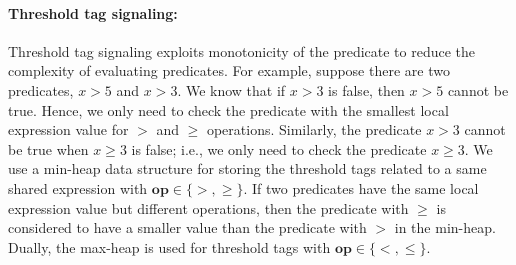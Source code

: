\documentclass{sigplanconf}
\newtheorem{definition}{Definition}
\begin{document}
\paragraph{Threshold tag signaling:}
Threshold tag signaling exploits monotonicity of the predicate
to reduce the complexity of evaluating predicates. For example,
suppose there are two 
predicates, $x > 5$ and $x > 3$. We know that if $x > 3$ is false, then 
$x > 5$ cannot be true. Hence, we only need to check the predicate with the 
smallest local expression value for $>$ and $\ge$ operations. 
Similarly, the predicate $x > 3$ cannot be true when 
$x \ge 3$ is false; i.e., we only need to check the predicate $x \ge 3$. We use
a min-heap data structure for storing the threshold tags related to a same 
shared expression with $\boldsymbol{op} \in \{>, \ge\}$. If two predicates 
have the same local expression value but different operations, then the predicate 
with $\ge$ is considered to have a smaller value than the 
predicate with $>$ in the min-heap.
Dually, the max-heap is used for threshold tags with $\boldsymbol{op}
\in \{<, \le\}$. 


\end{document}

